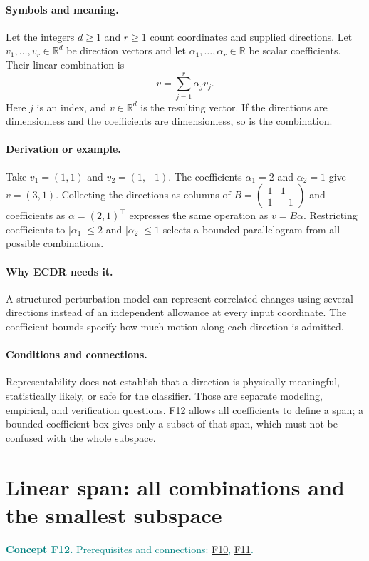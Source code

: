 \documentclass[11pt,a4paper]{article}
\newcommand{\R}{\mathbb R}
\newcommand{\conceptid}{Front matter}
\newcommand{\concept}[3]{\clearpage\renewcommand{\conceptid}{#1}%
\section{#2}\label{concept:#1}%
\textcolor{teal}{\textbf{Concept #1.} Prerequisites and connections: #3.}\par
\typeout{ECDR-CONCEPT-START #1 PAGE=\thepage}}
\begin{document}
\paragraph{Symbols and meaning.}
Let the integers $d\ge1$ and $r\ge1$ count coordinates and supplied
directions. Let $v_1,\ldots,v_r\in\R^d$ be direction vectors and let
$\alpha_1,\ldots,\alpha_r\in\R$ be scalar coefficients. Their linear
combination is
\[
 v=\sum_{j=1}^{r}\alpha_j v_j.
\]
Here $j$ is an index, and $v\in\R^d$ is the resulting vector.
If the directions are dimensionless and the coefficients are
dimensionless, so is the combination.
\paragraph{Derivation or example.}
Take $v_1=(1,1)$ and $v_2=(1,-1)$. The coefficients
$\alpha_1=2$ and $\alpha_2=1$ give $v=(3,1)$.
Collecting the directions as columns of
$B=\begin{pmatrix}1&1\\1&-1\end{pmatrix}$ and coefficients as
$\alpha=(2,1)^\top$ expresses the same operation as $v=B\alpha$.
Restricting coefficients to $|\alpha_1|\le2$ and $|\alpha_2|\le1$
selects a bounded parallelogram from all possible combinations.
\paragraph{Why ECDR needs it.}
A structured perturbation model can represent correlated changes using
several directions instead of an independent allowance at every input
coordinate. The coefficient bounds specify how much motion along each
direction is admitted.
\paragraph{Conditions and connections.}
Representability does not establish that a direction is physically
meaningful, statistically likely, or safe for the classifier. Those are
separate modeling, empirical, and verification questions. \hyperref[concept:F12]{F12} allows all
coefficients to define a span; a bounded coefficient box gives only a
subset of that span, which must not be confused with the whole subspace.
\par\label{endconcept:F11}

\concept{F12}{Linear span: all combinations and the smallest subspace}{\hyperref[concept:F10]{F10}, \hyperref[concept:F11]{F11}}
\end{document}
